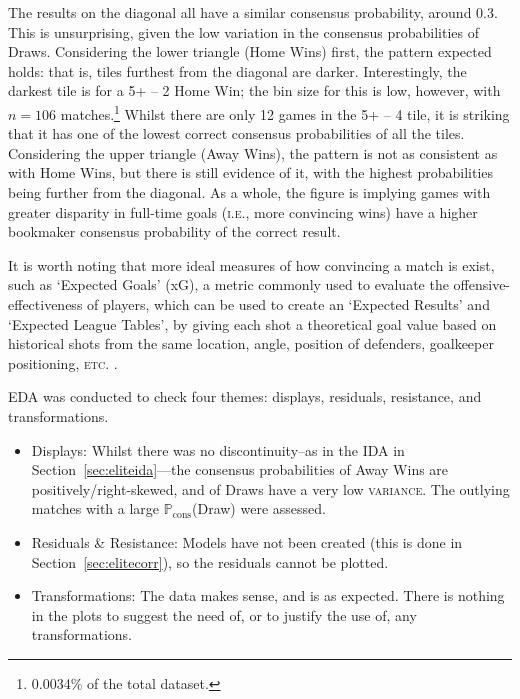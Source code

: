 \documentclass[a4paper,10pt]{report}
\begin{document}
The results on the diagonal all have a similar consensus probability, around 0.3. This is unsurprising, given the low variation in the consensus probabilities of Draws. Considering the lower triangle (Home Wins) first, the pattern expected holds: that is, tiles furthest from the diagonal are darker. Interestingly, the darkest tile is for a 5+ -- 2 Home Win; the bin size for this is low, however, with $n=106$ matches.\footnote{0.0034\% of the total dataset.} Whilst there are only 12 games in the 5+ -- 4 tile, it is striking that it has one of the lowest correct consensus probabilities of all the tiles. Considering the upper triangle (Away Wins), the pattern is not as consistent as with Home Wins, but there is still evidence of it, with the highest probabilities being further from the diagonal. As a whole, the figure is implying games with greater disparity in full-time goals (\textsc{i.e.}, more convincing wins) have a higher bookmaker consensus probability of the correct result.

It is worth noting that more ideal measures of how convincing a match is exist, such as `Expected Goals' (xG), a metric commonly used to evaluate the offensive-effectiveness of players, which can be used to create an `Expected Results' and `Expected League Tables', by giving each shot a theoretical goal value based on historical shots from the same location, angle, position of defenders, goalkeeper positioning, \textsc{etc}. \autocite{xgoals, xgoals2}.\vspace{3mm}

EDA was conducted to check four themes: displays, residuals, resistance, and transformations.
\begin{itemize}
	\item Displays: Whilst there was no discontinuity--as in the IDA in Section~\ref{sec:eliteida}---the consensus probabilities of Away Wins are positively/right-skewed, and of Draws have a very low \textsc{variance}. The outlying matches with a large $\mathbb{P}_{\textrm{cons}}$(Draw) were assessed.
	\item Residuals \& Resistance: Models have not been created (this is done in Section~\ref{sec:elitecorr}), so the residuals cannot be plotted. 
	\item Transformations: The data makes sense, and is as expected. There is nothing in the plots to suggest the need of, or to justify the use of, any transformations.
\end{itemize}
\end{document}
